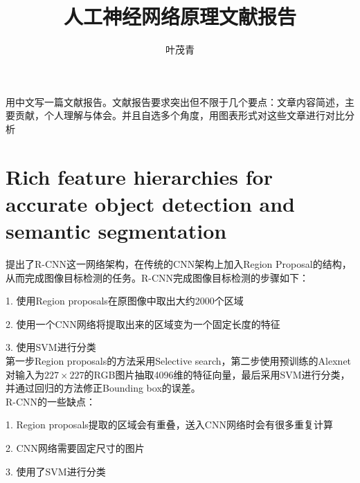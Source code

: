 \documentclass[12pt,onecolumn]{article}
\begin{document}
    \title{人工神经网络原理文献报告}
    \author{叶茂青}

    \maketitle
    用中文写一篇文献报告。文献报告要求突出但不限于几个要点：文章内容简述，主要贡献，个人理解与体会。并且自选多个角度，用图表形式对这些文章进行对比分析


    \section{Rich feature hierarchies for accurate object detection and semantic segmentation\cite{girshick2014rich}}
    提出了R-CNN这一网络架构，在传统的CNN架构上加入Region Proposal的结构，从而完成图像目标检测的任务。R-CNN完成图像目标检测的步骤如下：\par
    1. 使用Region proposals在原图像中取出大约2000个区域\par
    2. 使用一个CNN网络将提取出来的区域变为一个固定长度的特征\par 
    3. 使用SVM进行分类\\
    第一步Region proposals的方法采用Selective search，第二步使用预训练的Alexnet对输入为$227\times 227$的RGB图片抽取4096维的特征向量，最后采用SVM进行分类，并通过回归的方法修正Bounding box的误差。\\
    R-CNN的一些缺点：\par 
    1. Region proposals提取的区域会有重叠，送入CNN网络时会有很多重复计算\par 
    2. CNN网络需要固定尺寸的图片\par 
    3. 使用了SVM进行分类\par 
\end{document}
